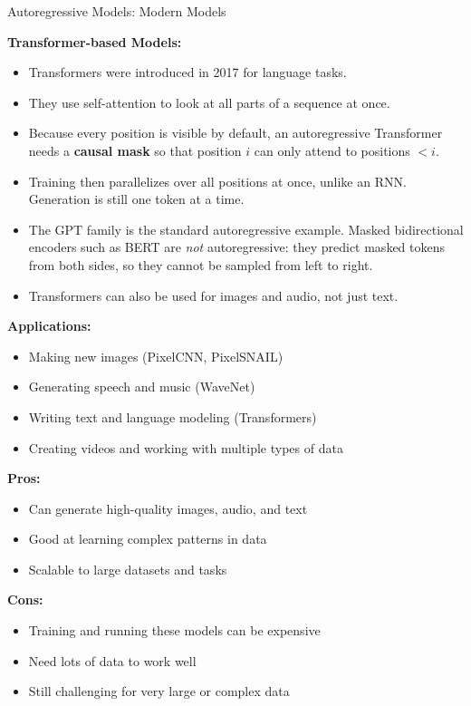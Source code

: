 \begin{frame}[allowframebreaks]{Autoregressive Models: Modern Models}
    \framebreak

    \textbf{Transformer-based Models:}
    \begin{itemize}
        \item Transformers were introduced in 2017 for language tasks.
        \item They use self-attention to look at all parts of a sequence at once.
        \item Because every position is visible by default, an autoregressive Transformer needs a \textbf{causal mask} so that position $i$ can only attend to positions $< i$.
        \item Training then parallelizes over all positions at once, unlike an RNN. Generation is still one token at a time.
        \item The GPT family is the standard autoregressive example. Masked bidirectional encoders such as BERT are \emph{not} autoregressive: they predict masked tokens from both sides, so they cannot be sampled from left to right.
        \item Transformers can also be used for images and audio, not just text.
    \end{itemize}

    \framebreak

    \textbf{Applications:}
    \begin{itemize}
        \item Making new images (PixelCNN, PixelSNAIL)
        \item Generating speech and music (WaveNet)
        \item Writing text and language modeling (Transformers)
        \item Creating videos and working with multiple types of data
    \end{itemize}

    \framebreak

    \textbf{Pros:}
    \begin{itemize}
        \item Can generate high-quality images, audio, and text
        \item Good at learning complex patterns in data
        \item Scalable to large datasets and tasks
    \end{itemize}

    \textbf{Cons:}
    \begin{itemize}
        \item Training and running these models can be expensive
        \item Need lots of data to work well
        \item Still challenging for very large or complex data
    \end{itemize}
\end{frame}

